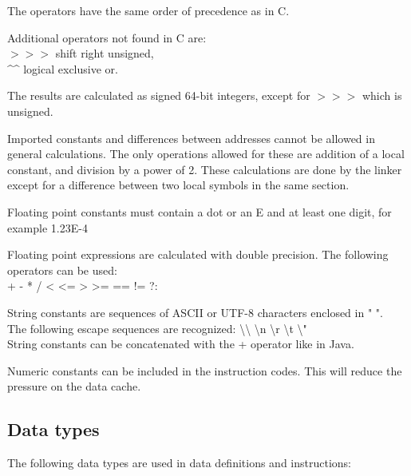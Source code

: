 \documentclass[forwardcom.tex]{subfiles}
\begin{document}
The operators have the same order of precedence as in C.
\vv

Additional operators not found in C are: \\
$>>>$ \hspace{2mm} shift right unsigned, \\ 
\^{}\^{} \hspace{7.5mm} logical exclusive or.
\vv


The results are calculated as signed 64-bit integers, except for $>>>$ \hspace{0.5mm} which is unsigned.
\vv

Imported constants and differences between addresses cannot be allowed in general calculations. 
The only operations allowed for these are addition of a local constant, and division by a power of 2.
These calculations are done by the linker except for a difference between two local symbols in the same section.
\vv

Floating point constants must contain a dot or an E and at least one digit, for example 1.23E-4
\vv

Floating point expressions are calculated with double precision. The following operators can be used: \\
+ \hspace{2mm} - \hspace{2mm} * \hspace{2mm} / \hspace{2mm} 
\textless \hspace{2mm} \textless= \hspace{2mm} \textgreater \hspace{2mm} \textgreater= \hspace{2mm} 
 == \hspace{2mm} != \hspace{2mm} ?: 
\vv

String constants are sequences of ASCII or UTF-8 characters enclosed in " ".\\
The following escape sequences are recognized: \textbackslash\textbackslash \hspace{1mm}
\textbackslash n \textbackslash r  \textbackslash t  \textbackslash " \\
String constants can be concatenated with the + operator like in Java.
\vv

Numeric constants can be included in the instruction codes. This will reduce the pressure on the data cache.
\vv



\subsection{Data types} \label{assemblyDataTypes}
The following data types are used in data definitions and instructions:
\end{document}
